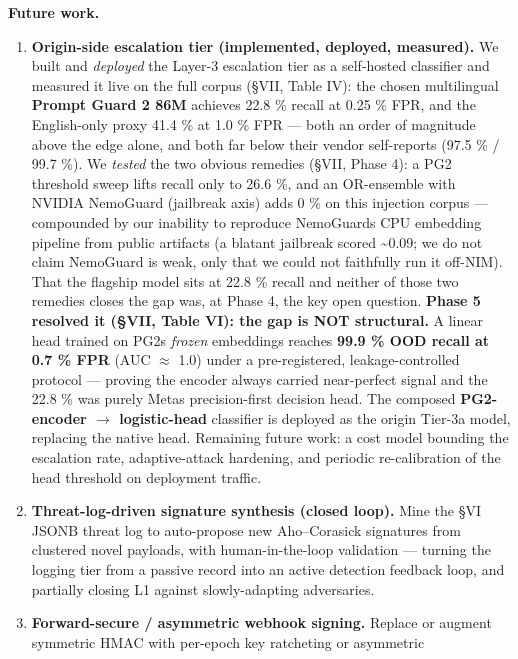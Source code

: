 \textbf{Future work.}

\begin{enumerate}
\def\labelenumi{\arabic{enumi}.}
\tightlist
\item
  \textbf{Origin-side escalation tier (implemented, deployed,
  measured).} We built and \emph{deployed} the Layer-3 escalation tier
  as a self-hosted classifier and measured it live on the full corpus
  (§VII, Table IV): the chosen multilingual \textbf{Prompt Guard 2 86M}
  achieves 22.8 \% recall at 0.25 \% FPR, and the English-only proxy
  41.4 \% at 1.0 \% FPR --- both an order of magnitude above the edge
  alone, and both far below their vendor self-reports (97.5 \% / 99.7
  \%). We \emph{tested} the two obvious remedies (§VII, Phase 4): a PG2
  threshold sweep lifts recall only to 26.6 \%, and an OR-ensemble with
  NVIDIA NemoGuard (jailbreak axis) adds 0 \% on this injection corpus
  --- compounded by our inability to reproduce
  NemoGuard\textquotesingle s CPU embedding pipeline from public
  artifacts (a blatant jailbreak scored \textasciitilde0.09; we do not
  claim NemoGuard is weak, only that we could not faithfully run it
  off-NIM). That the flagship model sits at 22.8 \% recall and neither
  of those two remedies closes the gap was, at Phase 4, the key open
  question. \textbf{Phase 5 resolved it (§VII, Table VI): the gap is NOT
  structural.} A linear head trained on PG2\textquotesingle s
  \emph{frozen} embeddings reaches \textbf{99.9 \% OOD recall at 0.7 \%
  FPR} (AUC $\approx$ 1.0) under a pre-registered, leakage-controlled protocol
  --- proving the encoder always carried near-perfect signal and the
  22.8 \% was purely Meta\textquotesingle s precision-first decision
  head. The composed \textbf{PG2-encoder $\to$ logistic-head} classifier is
  deployed as the origin Tier-3a model, replacing the native head.
  Remaining future work: a cost model bounding the escalation rate,
  adaptive-attack hardening, and periodic re-calibration of the head
  threshold on deployment traffic.
\item
  \textbf{Threat-log-driven signature synthesis (closed loop).} Mine the
  §VI JSONB threat log to auto-propose new Aho--Corasick signatures from
  clustered novel payloads, with human-in-the-loop validation ---
  turning the logging tier from a passive record into an active
  detection feedback loop, and partially closing L1 against
  slowly-adapting adversaries.
\item
  \textbf{Forward-secure / asymmetric webhook signing.} Replace or
  augment symmetric HMAC with per-epoch key ratcheting or asymmetric

\end{enumerate}

